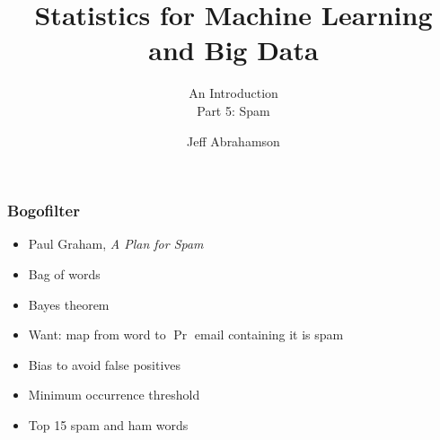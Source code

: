 

\title
{Statistics for Machine Learning and Big Data}
\subtitle{An Introduction\\[6mm] Part 5: Spam}

\author[Abrahamson] {Jeff Abrahamson}




\begin{frame}
  \titlepage
\end{frame}


\begin{frame}
  \frametitle{Bogofilter}

   {
    \begin{itemize}
    \item Paul Graham, \textit{A Plan for Spam}
    \item Bag of words
    \item Bayes theorem
    \end{itemize}

  }
   {
    \begin{itemize}
    \item Want: map from word to $\Pr$ email containing it is spam
    \item Bias to avoid false positives
    \item Minimum occurrence threshold
    \item Top 15 spam and ham words
    \end{itemize}
  }

\end{frame}

\begin{frame}
  \frametitle{}

\end{frame}

\begin{frame}
  \frametitle{}

\end{frame}

\begin{frame}
  \frametitle{}

\end{frame}

